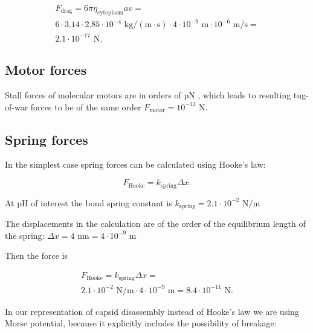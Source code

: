 \begin{equation}
\begin{split}
F_{\text{drag}} = 6\pi\eta_{\text{cytoplasm}} av = \\
6 \cdot 3.14 \cdot 2.85 \cdot 10^{-4} \text{ kg}/(\text{m} \cdot \text{s}) \cdot 4 \cdot 10^{-9} \text{ m} \cdot 10^{-6} \text{ m/s} =\\
2.1 \cdot 10^{-17} \text{ N}.
\end{split}
\end{equation}

\subsection{Motor forces}

Stall forces of molecular motors are in orders of pN \cite{muller2008tug}, which leads to resulting tug-of-war forces to be of the same order $F_{\text{motor}} = 10^{-12} \text{ N}$.

\subsection{Spring forces}

In the simplest case spring forces can be calculated using Hooke's law:

\begin{equation}
F_{\text{Hooke}} = k_{\text{spring}}\Delta x.
\end{equation}

At pH of interest the bond spring constant is $k_{\text{spring}} = 2.1 \cdot 10^{-2} \text{ N}/\text{m}$ \cite{li2014ph}

The displacements in the calculation are of the order of the equilibrium length of the spring: $\Delta x = 4 \text{ nm} = 4 \cdot 10^{-9} \text{ m}$

Then the force is

\begin{equation}
\begin{split}
F_{\text{Hooke}} = k_{\text{spring}}\Delta x =\\
2.1 \cdot 10^{-2} \text{ N}/\text{m} \cdot 4 \cdot 10^{-9} \text{ m} = 8.4 \cdot 10^{-11} \text{ N}.
\end{split}
\end{equation}

In our representation of capsid disassembly instead of Hooke's law we are using Morse potential, because it explicitly includes the possibility of breakage:


